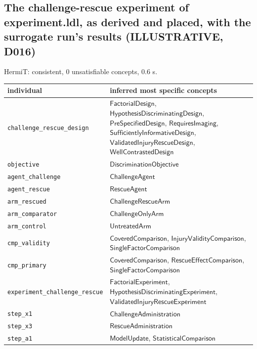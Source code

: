 \documentclass[10pt,a4paper]{article}
\begin{document}
\subsection*{The challenge-rescue experiment of experiment.ldl, as derived and placed, with the surrogate run's results (ILLUSTRATIVE, D016)}
HermiT: consistent, 0 unsatisfiable concepts, 0.6 s.
\par\noindent\begin{tabularx}{\linewidth}{@{}>{\raggedright\arraybackslash}p{4.2cm}>{\raggedright\arraybackslash}X@{}}\toprule individual & inferred most specific concepts \\ \midrule
\texttt{challenge\_\allowbreak{}rescue\_\allowbreak{}design} & $\mathsf{FactorialDesign}$, $\mathsf{HypothesisDiscriminatingDesign}$, $\mathsf{PreSpecifiedDesign}$, $\mathsf{RequiresImaging}$, $\mathsf{SufficientlyInformativeDesign}$, $\mathsf{ValidatedInjuryRescueDesign}$, $\mathsf{WellContrastedDesign}$ \\
\texttt{objective} & $\mathsf{DiscriminationObjective}$ \\
\texttt{agent\_\allowbreak{}challenge} & $\mathsf{ChallengeAgent}$ \\
\texttt{agent\_\allowbreak{}rescue} & $\mathsf{RescueAgent}$ \\
\texttt{arm\_\allowbreak{}rescued} & $\mathsf{ChallengeRescueArm}$ \\
\texttt{arm\_\allowbreak{}comparator} & $\mathsf{ChallengeOnlyArm}$ \\
\texttt{arm\_\allowbreak{}control} & $\mathsf{UntreatedArm}$ \\
\texttt{cmp\_\allowbreak{}validity} & $\mathsf{CoveredComparison}$, $\mathsf{InjuryValidityComparison}$, $\mathsf{SingleFactorComparison}$ \\
\texttt{cmp\_\allowbreak{}primary} & $\mathsf{CoveredComparison}$, $\mathsf{RescueEffectComparison}$, $\mathsf{SingleFactorComparison}$ \\
\texttt{experiment\_\allowbreak{}challenge\_\allowbreak{}rescue} & $\mathsf{FactorialExperiment}$, $\mathsf{HypothesisDiscriminatingExperiment}$, $\mathsf{ValidatedInjuryRescueExperiment}$ \\
\texttt{step\_\allowbreak{}x1} & $\mathsf{ChallengeAdministration}$ \\
\texttt{step\_\allowbreak{}x3} & $\mathsf{RescueAdministration}$ \\
\texttt{step\_\allowbreak{}a1} & $\mathsf{ModelUpdate}$, $\mathsf{StatisticalComparison}$ \\
\bottomrule\end{tabularx}
\end{document}
